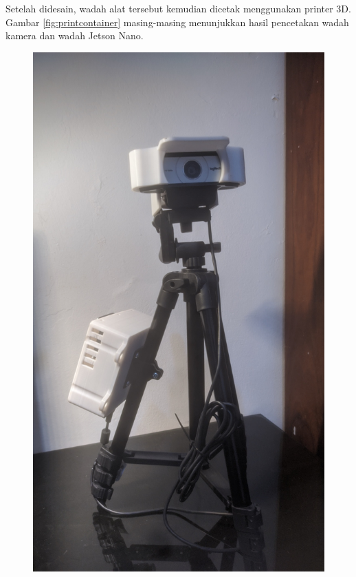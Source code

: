 Setelah didesain, wadah alat tersebut kemudian dicetak menggunakan printer 3D. Gambar \ref{fig:printcontainer} masing-masing menunjukkan hasil pencetakan wadah kamera dan wadah Jetson Nano.

\begin{figure}[htbp]
  \centering

  \includegraphics[scale=0.15,angle=-90]{gambar/bab3-case-camera-printed.jpg}

\end{figure}
